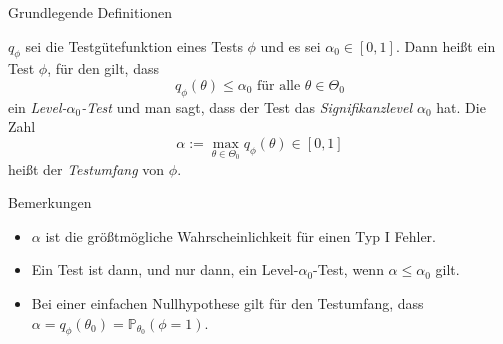 \documentclass[
  8pt,
  ignorenonframetext,
]{beamer}
\providecommand{\tightlist}{%
  \setlength{\itemsep}{0pt}\setlength{\parskip}{0pt}}
\begin{document}
\begin{frame}{Grundlegende Definitionen}
\protect\hypertarget{grundlegende-definitionen-12}{}
\small
\begin{definition}
$q_\phi$ sei die Testgütefunktion eines Tests $\phi$ und es sei
$\alpha_0 \in [0,1]$. Dann heißt ein Test $\phi$, für den gilt, dass
\begin{equation}
q_\phi(\theta) \le \alpha_0 \mbox{ für alle } \theta \in \Theta_0
\end{equation}
ein \textit{Level-$\alpha_0$-Test} und man sagt, dass der Test das
\textit{Signifikanzlevel $\alpha_0$} hat. Die Zahl
\begin{equation}
\alpha := \max_{\theta \in \Theta_0} q_\phi(\theta) \in [0,1]
\end{equation}
heißt der \textit{Testumfang} von $\phi$.
\end{definition}

Bemerkungen

\begin{itemize}
\tightlist
\item
  \(\alpha\) ist die größtmögliche Wahrscheinlichkeit für einen Typ I
  Fehler.
\item
  Ein Test ist dann, und nur dann, ein Level-\(\alpha_0\)-Test, wenn
  \(\alpha \le \alpha_0\) gilt.
\item
  Bei einer einfachen Nullhypothese gilt für den Testumfang, dass
  \(\alpha = q_{\phi}(\theta_0) = \mathbb{P}_{\theta_0}(\phi = 1)\).
\end{itemize}
\end{frame}
\end{document}
